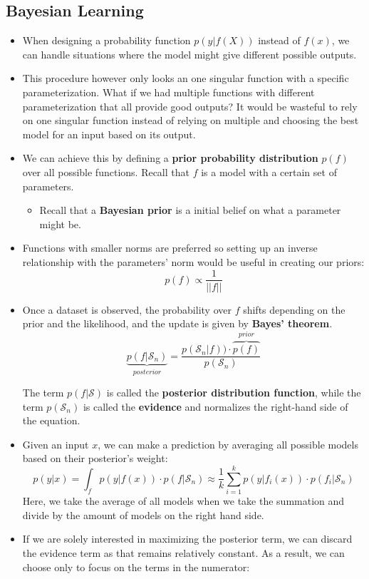 \documentclass{article}
\newcommand{\tbf}[1]{\textbf{#1}}
\begin{document}
    \subsection{Bayesian Learning}
    \begin{itemize}
        \item When designing a probability function $p(y|f(X))$ instead of $f(x)$, we can handle situations where the model might give different possible outputs. 
        \item This procedure however only looks an one singular function with a specific parameterization. What if we had multiple functions with different parameterization that all provide good outputs? It would be wasteful to rely on one singular function instead of relying on multiple and choosing the best model for an input based on its output.
        \item We can achieve this by defining a \tbf{prior probability distribution} $p(f)$ over all possible functions. Recall that $f$ is a model with a certain set of parameters.
        \begin{itemize}
            \item Recall that a \tbf{Bayesian prior} is a initial belief on what a parameter might be.
        \end{itemize}
        \item Functions with smaller norms are preferred so setting up an inverse relationship with the parameters' norm would be useful in creating our priors:
        \[p(f) \propto \frac{1}{||f||}\]
        \item Once a dataset is observed, the probability over $f$ shifts depending on the prior and the likelihood, and the update is given by \tbf{Bayes' theorem}.
        \[\underbrace{p(f|\mathcal{S}_n)}_{posterior}=\frac{p(\mathcal{S}_n|f))\cdot \overbrace{p(f)}^{prior}}{p(\mathcal{S}_n)}\]

        The term $p(f|\mathcal{S})$ is called the \tbf{posterior distribution function}, while the term $p(\mathcal{S}_n)$ is called the \tbf{evidence} and normalizes the right-hand side of the equation.

        \item Given an input $x$, we can make a prediction by averaging all possible models based on their posterior's weight:
        \[p(y|x) = \int _f p(y|f(x)) \cdot p(f|\mathcal{S}_n) \approx \frac{1}{k} \sum ^k _{i=1} p(y|f_i(x)) \cdot p(f_i|\mathcal{S}_n)\]
        Here, we take the average of all models when we take the summation and divide by the amount of models on the right hand side.
        \item If we are solely interested in maximizing the posterior term, we can discard the evidence term as that remains relatively constant. As a result, we can choose only to focus on the terms in the numerator:
        

\end{itemize}
\end{document}
